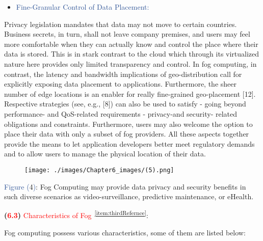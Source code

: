 \documentclass[11pt]{article}
\begin{document}
\vspace{1\baselineskip}
\begin{itemize}
\item {\Large \textcolor[HTML]{2F5496}{Fine-Granular Control of Data Placement:}}
\end{itemize}

{\large Privacy legislation mandates that data may not move to certain countries. Business secrets, in turn, shall not leave company premises, and users may feel more comfortable when they can actually know and control the place where their data is stored. This is in stark contrast to the cloud which through its virtualized nature here provides only limited transparency and control. In fog computing, in contrast, the latency and bandwidth implications of geo-distribution call for explicitly exposing data placement to applications. Furthermore, the sheer number of edge locations is an enabler for really fine-grained geo-placement [12]. Respective strategies (see, e.g., [8]) can also be used to satisfy - going beyond performance- and QoS-related requirements - privacy-and security- related obligations and constraints. Furthermore, users may also welcome the option to place their data with only a subset of fog providers. All these aspects together provide the means to let application developers better meet regulatory demands and to allow users to manage the physical location of their data.\par}



\newpage

\vspace{1\baselineskip}
{\large \begin{figure}[H]
\centering
\texttt{[image: ./images/Chapter6\_images/(5).png]}
\end{figure}
}

\textcolor[HTML]{2F5496}{Figure (}4\textcolor[HTML]{2F5496}{)}: Fog Computing may provide data privacy and security benefits in such diverse scenarios as video-surveillance, predictive maintenance, or eHealth.

\vspace{2\baselineskip}
{\LARGE \textbf{(\textcolor[HTML]{FF0000}{6.3})} \textcolor[HTML]{FF0000}{Characteristics of Fog}\textsuperscript{\textcolor[HTML]{0070C0}{~\ref{item:thirdRefernce}}}\textcolor[HTML]{FF0000}{}:\newline}

{\large Fog computing possess various characteristics, some of them are listed below:}
\end{document}
